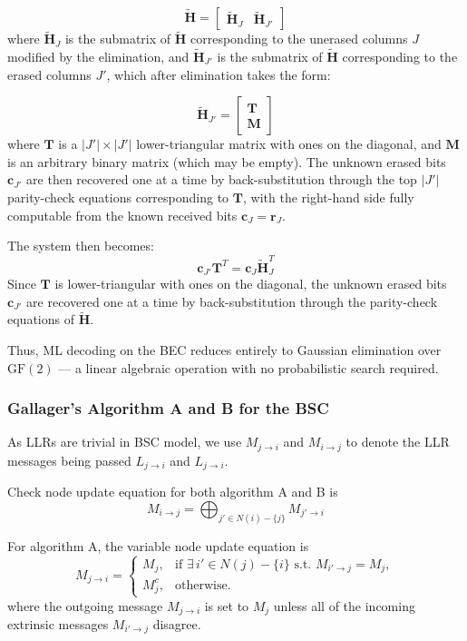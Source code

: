 \documentclass[11pt]{article}
\begin{document}
\[
    \tilde{\mathbf{H}} = \begin{bmatrix} \tilde{\mathbf{H}}_J & \tilde{\mathbf{H}}_{J'} \end{bmatrix}
\]
where $\tilde{\mathbf{H}}_J$ is the submatrix of $\tilde{\mathbf{H}}$ corresponding 
to the unerased columns $J$ modified by the elimination, and 
$\tilde{\mathbf{H}}_{J'}$ is the submatrix of $\tilde{\mathbf{H}}$ corresponding 
to the erased columns $J'$, which after elimination takes the form:

\[
    \tilde{\mathbf{H}}_{J'} = \begin{bmatrix} \mathbf{T} \\ \mathbf{M} \end{bmatrix}
\]
where $\mathbf{T}$ is a $|J'| \times |J'|$ lower-triangular matrix with ones on 
the diagonal, and $\mathbf{M}$ is an arbitrary binary matrix (which may be empty). 
The unknown erased bits $\mathbf{c}_{J'}$ are then recovered one at a time by 
back-substitution through the top $|J'|$ parity-check equations corresponding to 
$\mathbf{T}$, with the right-hand side fully computable from the known received 
bits $\mathbf{c}_J = \mathbf{r}_J$.

The system then becomes:
\[
    \mathbf{c}_{J'}\mathbf{T}^T = \mathbf{c}_J \tilde{\mathbf{H}}_J^T
\]
Since $\mathbf{T}$ is lower-triangular with ones on the diagonal, the unknown 
erased bits $\mathbf{c}_{J'}$ are recovered one at a time by back-substitution 
through the parity-check equations of $\tilde{\mathbf{H}}$. 

Thus, ML decoding on the BEC reduces entirely to Gaussian elimination over 
$\text{GF}(2)$ --- a linear algebraic operation with no probabilistic search 
required.


\subsubsection{Gallager's Algorithm A and B for the BSC}
As LLRs are trivial in BSC model, we use $M_{j \to i}$ and $M_{i \to j}$ to denote the LLR messages being passed $L_{j \to i}$ and $L_{j \to i}$.

Check node update equation for both algorithm A and B is
\[
M_{i \to j} =
\bigoplus_{j' \in N(i)-\{j\}} M_{j' \to i}
\]

For algorithm A, the variable node update equation is
\[
M_{j \to i}
=
\begin{cases}
M_j, & \text{if } \exists\, i' \in N(j)-\{i\} \text{ s.t. } M_{i' \to j} = M_j,\\
M_j^c, & \text{otherwise.}
\end{cases}
\]
where the outgoing message $M_{j \to i}$ is set to $M_j$ unless all of the
incoming extrinsic messages $M_{i'→j}$ disagree.
\end{document}
